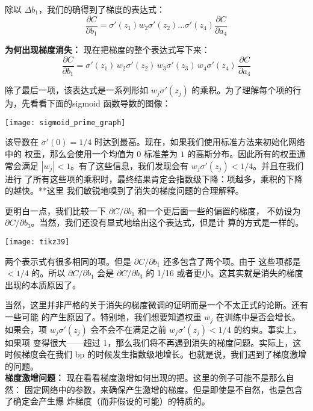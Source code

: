 除以 $\Delta b_1$，我们的确得到了梯度的表达式：
\begin{equation}
  \frac{\partial C}{\partial b_1} = \sigma'(z_1) w_2 \sigma'(z_2) \ldots
  \sigma'(z_4) \frac{\partial C}{\partial a_4}
\label{eq:121}\tag{121}
\end{equation}
 
\textbf{为何出现梯度消失：} 现在把梯度的整个表达式写下来：
\begin{equation}
  \frac{\partial C}{\partial b_1} = \sigma'(z_1) \, w_2 \sigma'(z_2) \, w_3
  \sigma'(z_3) \, w_4 \sigma'(z_4) \, \frac{\partial C}{\partial a_4}
  \label{eq:122}\tag{122}
\end{equation}
 
除了最后一项，该表达式是一系列形如 $w_j \sigma'(z_j)$ 的乘积。为了理解每个项的行
为，先看看下面的sigmoid 函数导数的图像：
\begin{center}
  \texttt{[image: sigmoid\_prime\_graph]}
\end{center}
 
该导数在 $\sigma'(0)=1/4$ 时达到最高。现在，如果我们使用标准方法来初始化网络中的
权重，那么会使用一个均值为 $0$ 标准差为 $1$ 的高斯分布。因此所有的权重通常会满足
$|w_j| < 1$。有了这些信息，我们发现会有 $w_j \sigma'(z_j) < 1/4$。并且在我们进行
了所有这些项的乘积时，最终结果肯定会指数级下降：项越多，乘积的下降的越快。**这里
我们敏锐地嗅到了消失的梯度问题的合理解释。
 
更明白一点，我们比较一下 $\partial C/\partial b_1$ 和一个更后面一些的偏置的梯度，
不妨设为 $\partial C/\partial b_3$。当然，我们还没有显式地给出这个表达式，但是计
算的方式是一样的。
\begin{center}
  \texttt{[image: tikz39]}
\end{center}

两个表示式有很多相同的项。但是 $\partial C/\partial b_1$ 还多包含了两个项。由于
这些项都是 $< 1/4$ 的。所以 $\partial C/\partial b_1$ 会是 $\partial C/\partial
b_3$ 的 1/16 或者更小。这其实就是消失的梯度出现的本质原因了。

当然，这里并非严格的关于消失的梯度微调的证明而是一个不太正式的论断。还有一些可能
的产生原因了。特别地，我们想要知道权重 $w_j$ 在训练中是否会增长。如果会，项 $w_j
\sigma'(z_j)$ 会不会不在满足之前 $w_j \sigma'(z_j) < 1/4$ 的约束。事实上，如果项
变得很大——超过 1，那么我们将不再遇到消失的梯度问题。实际上，这时候梯度会在我们%
\gls*{bp} 的时候发生指数级地增长。也就是说，我们遇到了梯度激增的问题。\\

\textbf{梯度激增问题：} 现在看看梯度激增如何出现的把。这里的例子可能不是那么自然：
固定网络中的参数，来确保产生激增的梯度。但是即使是不自然，也是包含了确定会产生爆
炸梯度（而非假设的可能）的特质的。
 
